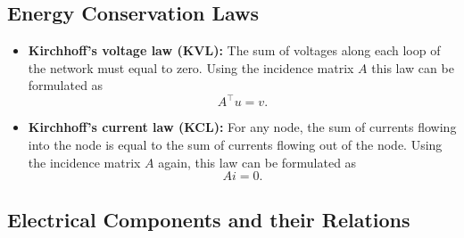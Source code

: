 	\subsection{Energy Conservation Laws}
	\begin{frame}
		\begin{itemize}
			\item \textbf{Kirchhoff's voltage law (KVL):} \newline
			The sum of voltages along each loop of the network must equal to zero. Using the incidence matrix $A$ this law can be formulated as
			\begin{equation}
				\label{KVL}
				A^\top  u = v.
			\end{equation}
			\item \textbf{Kirchhoff's current law (KCL):} \newline
			For any node, the sum of currents flowing into the node is equal to the sum of currents flowing out of the node. Using the incidence matrix $A$ again, this law can be formulated as
			\begin{equation}
				\label{KCL}
				A  i = 0.
			\end{equation}
		\end{itemize}
	\end{frame}

	\subsection{Electrical Components and their Relations}
		
